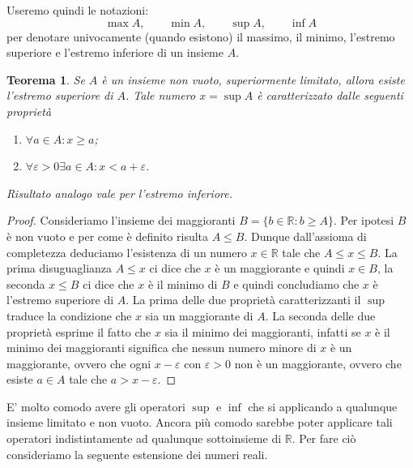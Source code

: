 \documentclass[italian,a4paper,oneside,headinclude]{scrbook}
\newcommand{\eps}{\varepsilon}
\newcommand{\RR}{\mathbb R}
\newtheorem{theorem}{Teorema}
\begin{document}
Useremo quindi le notazioni:
\[
 \max A, \qquad
 \min A, \qquad
 \sup A, \qquad
 \inf A
\]
per denotare univocamente (quando esistono) il massimo, il minimo,
l'estremo superiore e l'estremo inferiore di un insieme $A$.

\begin{theorem}
Se $A$ è un insieme non vuoto,
superiormente limitato, allora esiste l'estremo superiore di $A$.
Tale numero $x=\sup A$ è caratterizzato dalle seguenti proprietà
\begin{enumerate}
\item $\forall a\in A\colon x \ge a$;
\item $\forall \eps>0 \exists a\in A \colon x < a + \eps$.
\end{enumerate}

Risultato analogo vale per l'estremo inferiore.
\end{theorem}
%
\begin{proof}
Consideriamo l'insieme dei maggioranti
$B = \{ b\in \RR \colon b \ge A\}$.
Per ipotesi $B$ è non vuoto e per come è definito risulta $A\le B$.
Dunque dall'assioma di completezza deduciamo l'esistenza di un numero $x\in \RR$
tale che $A\le x \le B$. La prima disuguaglianza $A\le x$ ci dice che $x$ è un
maggiorante e quindi $x\in B$, la seconda $x\le B$ ci dice che $x$ è il minimo
di $B$ e quindi concludiamo che $x$ è l'estremo superiore di $A$.
La prima delle due proprietà caratterizzanti il $\sup$ traduce la condizione
che $x$ sia un maggiorante di $A$. La seconda delle due proprietà esprime il
fatto che $x$ sia il minimo dei maggioranti, infatti se $x$ è il minimo
dei maggioranti significa che nessun numero minore di $x$ è un maggiorante, ovvero
che ogni $x-\eps$ con $\eps>0$ non è un maggiorante, ovvero
che esiste $a\in A$ tale che $a > x-\eps$.
\end{proof}

E' molto comodo avere gli operatori $\sup$ e $\inf$ che si applicando a qualunque
insieme limitato e non vuoto. Ancora più comodo sarebbe poter applicare tali operatori
indistintamente ad qualunque sottoinsieme di $\RR$. Per fare ciò consideriamo la seguente
estensione dei numeri reali.
\end{document}
